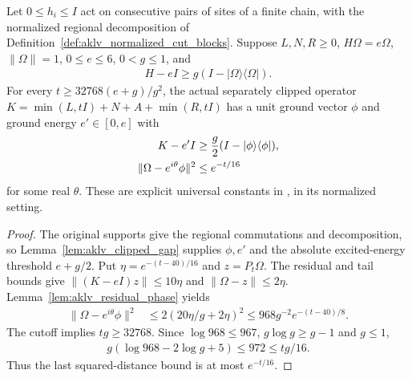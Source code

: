 \begin{theorem}
    \label{thm:aklv_robustness}
    \leanok
    Let $0\le h_i\le I$ act on consecutive pairs of sites of a finite
    chain, with the normalized regional decomposition of
    Definition~\ref{def:aklv_normalized_cut_blocks}. Suppose $L,N,R\ge0$,
    $H\Omega=e\Omega$, $\|\Omega\|=1$, $0\le e\le6$, $0<g\le1$, and
    \begin{align}
        H-eI\ge g(I-|\Omega\rangle\langle\Omega|).
    \end{align}
    For every $t\ge32768(e+g)/g^2$, the actual separately clipped operator
    $K=\min(L,tI)+N+A+\min(R,tI)$ has a unit ground vector $\phi$ and
    ground energy $e'\in[0,e]$ with
    \begin{align}
        K-e'I                        & \ge\frac g2(I-|\phi\rangle\langle\phi|),\notag \\
        \|\Omega-e^{i\theta}\phi\|^2 & \le e^{-t/16}
    \end{align}
    for some real $\theta$. These are explicit universal constants in
    \cite[Theorem~6.1]{Arad2013AreaLaw}, in its normalized setting.
\end{theorem}
\begin{proof}\leanok
    The original supports give the regional commutations and decomposition,
    so Lemma~\ref{lem:aklv_clipped_gap} supplies $\phi,e'$ and the absolute
    excited-energy threshold $e+g/2$. Put $\eta=e^{-(t-40)/16}$ and
    $z=P_t\Omega$. The residual and tail bounds give
    $\|(K-eI)z\|\le10\eta$ and $\|\Omega-z\|\le2\eta$.
    Lemma~\ref{lem:aklv_residual_phase} yields
    \begin{align}
        \|\Omega-e^{i\theta}\phi\|^2
         & \le2(20\eta/g+2\eta)^2
        \le968g^{-2}e^{-(t-40)/8}.
    \end{align}
    The cutoff implies $tg\ge32768$. Since
    $\log968\le967$, $g\log g\ge g-1$ and $g\le1$,
    \begin{align}
        g(\log968-2\log g+5)\le972\le tg/16.
    \end{align}
    Thus the last squared-distance bound is at most $e^{-t/16}$.
\end{proof}


